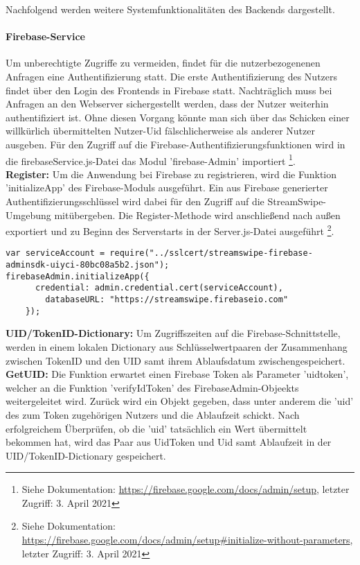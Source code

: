 Nachfolgend werden weitere Systemfunktionalitäten des Backends dargestellt.

\paragraph{Firebase-Service}
Um unberechtigte Zugriffe zu vermeiden, findet für die nutzerbezogenenen Anfragen eine Authentifizierung statt. Die erste Authentifizierung des Nutzers findet über den Login des Frontends in Firebase statt. Nachträglich muss bei Anfragen an den Webserver sichergestellt werden, dass der Nutzer weiterhin authentifiziert ist. Ohne diesen Vorgang könnte man sich über das Schicken einer willkürlich übermittelten Nutzer-Uid fälschlicherweise als anderer Nutzer ausgeben. Für den Zugriff auf die Firebase-Authentifizierungsfunktionen wird in die firebaseService.js-Datei das Modul 'firebase-Admin' importiert \footnote{Siehe Dokumentation: \url{https://firebase.google.com/docs/admin/setup}, letzter Zugriff: 3. April 2021}.\\

\noindent
\textbf{Register:}
Um die Anwendung bei Firebase zu registrieren, wird die Funktion 'initializeApp' des Firebase-Moduls ausgeführt. 
Ein aus Firebase generierter Authentifizierungsschlüssel wird dabei für den Zugriff auf die StreamSwipe-Umgebung mitübergeben.
Die Register-Methode wird anschließend nach außen exportiert und zu Beginn des Serverstarts in der Server.js-Datei ausgeführt 
\footnote{Siehe Dokumentation: \url{https://firebase.google.com/docs/admin/setup\#initialize-without-parameters}, letzter Zugriff: 3. April 2021}.\\
   
\begin{lstlisting}[caption=Firebase-Service Register, label=lst:firebaseService Register]
var serviceAccount = require("../sslcert/streamswipe-firebase-adminsdk-uiyci-80bc08a5b2.json");
firebaseAdmin.initializeApp({
      credential: admin.credential.cert(serviceAccount),
        databaseURL: "https://streamswipe.firebaseio.com"
    });
\end{lstlisting}

\noindent
{}
\textbf{UID/TokenID-Dictionary:}
Um Zugriffszeiten auf die Firebase-Schnittstelle, werden in einem lokalen Dictionary aus Schlüsselwertpaaren der Zusammenhang zwischen TokenID und den UID samt ihrem Ablaufsdatum zwischen\-gespeichert.\\

\noindent
\textbf{GetUID:}
Die Funktion erwartet einen Firebase Token als Parameter 'uidtoken', welcher an die Funktion 'verifyIdToken' des FirebaseAdmin-Objeekts weitergeleitet wird. Zurück wird ein Objekt gegeben, dass unter anderem die 'uid' des zum Token zugehörigen Nutzers und die Ablaufzeit schickt. Nach erfolgreichem Überprüfen, ob die 'uid' tatsächlich ein Wert übermittelt bekommen hat, wird das Paar aus UidToken und Uid samt Ablaufzeit in der UID/TokenID-Dictionary gespeichert.\\

